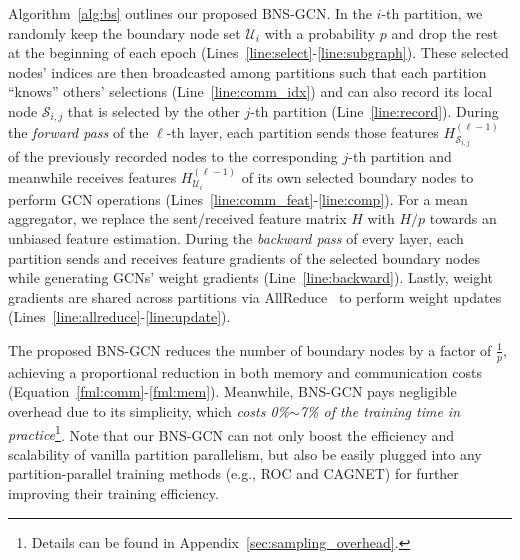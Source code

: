 \documentclass{article}
\begin{document}
Algorithm~\ref{alg:bs} outlines our proposed BNS-GCN. 
In the $i$-th partition, we randomly keep the boundary node set $\mathcal{U}_i$ with a probability $p$ and drop the rest at the beginning of each epoch (Lines~\ref{line:select}-\ref{line:subgraph}). 
These selected nodes' indices are then broadcasted among partitions such that each partition ``knows'' others' selections (Line~\ref{line:comm_idx}) and can also record its local node $\mathcal{S}_{i,j}$ that is selected by the other $j$-th partition (Line~\ref{line:record}). 
During the \textit{forward pass} of the $\ell$-th layer, each partition sends those features $H^{(\ell-1)}_{\mathcal{S}_{i,j}}$  of the previously recorded nodes to the corresponding $j$-th partition and meanwhile receives features $H^{(\ell-1)}_{\mathcal{U}_i}$ of its own selected boundary nodes to perform GCN operations (Lines~\ref{line:comm_feat}-\ref{line:comp}). 
For a mean aggregator, we replace the sent/received feature matrix $H$ with $H/p$ towards an unbiased feature estimation.
During the \textit{backward pass} of every layer, each partition sends and receives feature gradients of the selected boundary nodes while generating GCNs' weight gradients (Line~\ref{line:backward}).
Lastly, weight gradients are shared across partitions via AllReduce~\citep{thakur2005mpich} to perform weight updates (Lines~\ref{line:allreduce}-\ref{line:update}).

The proposed BNS-GCN reduces the number of boundary nodes by a factor of $\frac{1}{p}$, 
achieving a proportional reduction in both memory and communication costs (Equation~\ref{fml:comm}-\ref{fml:mem}).
Meanwhile, BNS-GCN pays negligible overhead due to its simplicity, which \textit{costs 0\%$\sim$7\% of the training time in practice}\footnote{Details can be found in Appendix~\ref{sec:sampling_overhead}.}.
Note that our BNS-GCN can not only boost the efficiency and scalability of vanilla partition parallelism, but also be easily plugged into any partition-parallel training methods (e.g., ROC and CAGNET) for further improving their training efficiency.
\end{document}
